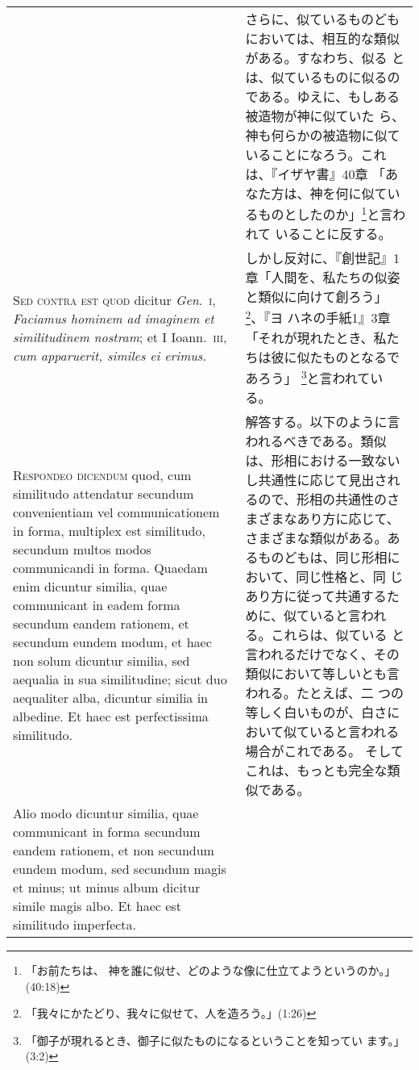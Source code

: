 \documentclass[10pt]{jsarticle}
\begin{document}
\begin{longtable}{p{21em}p{21em}}
&

さらに、似ているものどもにおいては、相互的な類似がある。すなわち、似る
とは、似ているものに似るのである。ゆえに、もしある被造物が神に似ていた
ら、神も何らかの被造物に似ていることになろう。これは、『イザヤ書』40章
「あなた方は、神を何に似ているものとしたのか」\footnote{「お前たちは、
神を誰に似せ、どのような像に仕立てようというのか。」(40:18)}と言われて
いることに反する。

\\

{\scshape Sed contra est quod} dicitur {\itshape Gen}.~{\scshape i},
{\itshape Faciamus hominem ad imaginem et similitudinem nostram}; et I
Ioann.~{\scshape iii}, {\itshape cum apparuerit, similes ei erimus}.

&

しかし反対に、『創世記』1章「人間を、私たちの似姿と類似に向けて創ろう」
\footnote{「我々にかたどり、我々に似せて、人を造ろう。」(1:26)}、『ヨ
ハネの手紙1』3章「それが現れたとき、私たちは彼に似たものとなるであろう」
\footnote{「御子が現れるとき、御子に似たものになるということを知ってい
ます。」(3:2)}と言われている。

\\

{\scshape Respondeo dicendum} quod, cum similitudo attendatur secundum
 convenientiam vel communicationem in forma, multiplex est similitudo,
 secundum multos modos communicandi in forma. Quaedam enim dicuntur
 similia, quae communicant in eadem forma secundum eandem rationem, et
 secundum eundem modum, et haec non solum dicuntur similia, sed
 aequalia in sua similitudine; sicut duo aequaliter alba, dicuntur
 similia in albedine. Et haec est perfectissima similitudo.

&


解答する。以下のように言われるべきである。類似は、形相における一致ない
し共通性に応じて見出されるので、形相の共通性のさまざまなあり方に応じて、
さまざまな類似がある。あるものどもは、同じ形相において、同じ性格と、同
じあり方に従って共通するために、似ていると言われる。これらは、似ている
と言われるだけでなく、その類似において等しいとも言われる。たとえば、二
つの等しく白いものが、白さにおいて似ていると言われる場合がこれである。
そしてこれは、もっとも完全な類似である。

\\

Alio modo dicuntur similia, quae communicant in forma secundum eandem
rationem, et non secundum eundem modum, sed secundum magis et minus;
ut minus album dicitur simile magis albo. Et haec est similitudo
imperfecta.


\end{longtable}
\end{document}
